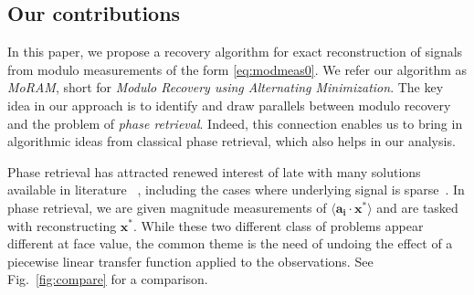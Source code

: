 \subsection{Our contributions}
In this paper, we propose a recovery algorithm for exact reconstruction of signals from modulo measurements of the form \eqref{eq:modmeas0}. We refer our algorithm as \emph{MoRAM}, short for \emph{Modulo Recovery using Alternating Minimization}. The key idea in our approach is to identify and draw parallels between modulo recovery and the problem of \emph{phase retrieval}. Indeed, this connection enables us to bring in algorithmic ideas from classical phase retrieval, which also helps in our analysis. 

Phase retrieval has attracted renewed interest of late with many solutions available in literature ~\cite{candes2013phaselift,gross2017improved,candes2015phasediff}, including the cases where underlying signal is sparse~\cite{ohlsson2012cprl,li2013sparse,bahmani2015efficient,jaganathan2012recovery,netrapalli2013phase, cai2016optimal, wang2016sparse}. In phase retrieval, we are given magnitude measurements of $\langle\mathbf{a_i} \cdot \mathbf{x^*} \rangle$ and are tasked with reconstructing $\mathbf{x^*}$. While these two different class of problems appear different at face value, the common theme is the need of undoing the effect of a piecewise linear transfer function applied to the observations. See Fig.~\ref{fig:compare} for a comparison.
